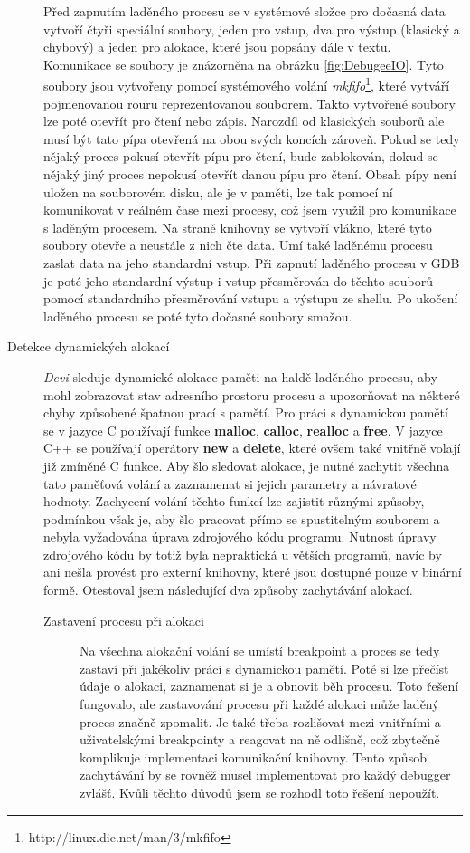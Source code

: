\documentclass[bc,male,python,dept460]{diploma}						%
\begin{document}
\begin{description}
			\par Před zapnutím laděného procesu se v systémové složce pro dočasná data vytvoří čtyři speciální soubory, jeden pro vstup, dva pro výstup
			(klasický a chybový) a jeden pro alokace, které jsou popsány dále v textu. Komunikace se soubory je znázorněna na obrázku \ref{fig:DebugeeIO}.
			Tyto soubory jsou vytvořeny pomocí systémového volání \textit{mkfifo}\footnote{http://linux.die.net/man/3/mkfifo}, které vytváří pojmenovanou rouru
			reprezentovanou souborem. Takto vytvořené soubory lze poté otevřít pro čtení nebo zápis. Narozdíl od klasických souborů ale musí být tato pípa otevřená na
			obou svých koncích zároveň. Pokud se tedy nějaký proces pokusí otevřít pípu pro čtení, bude zablokován, dokud se nějaký jiný proces nepokusí otevřít danou
			pípu pro čtení. Obsah pípy není uložen na souborovém disku, ale je v paměti, lze tak pomocí ní komunikovat v reálném čase mezi procesy, což jsem využil
			pro komunikace s laděným procesem. Na straně knihovny se vytvoří vlákno, které tyto soubory otevře a neustále z nich čte data. Umí také laděnému procesu
			zaslat data na jeho standardní vstup. Při zapnutí laděného procesu v GDB je poté jeho standardní výstup i vstup přesměrován do těchto souborů pomocí
			standardního přesměrování vstupu a výstupu ze shellu. %
			Po ukočení laděného procesu se poté tyto dočasné soubory smažou.
			
			\item[Detekce dynamických alokací]
			\textit{Devi} sleduje dynamické alokace paměti na haldě laděného procesu, aby mohl zobrazovat stav adresního prostoru procesu a upozorňovat na některé
			chyby způsobené špatnou prací s pamětí. Pro práci s dynamickou pamětí se v jazyce C používají funkce \textbf{malloc}, \textbf{calloc}, \textbf{realloc}
			a \textbf{free}. V jazyce C++ se používají operátory \textbf{new} a \textbf{delete}, které ovšem také vnitřně volají již zmíněné C funkce. Aby šlo sledovat
			alokace, je nutné zachytit všechna tato paměťová volání a zaznamenat si jejich parametry a návratové hodnoty. Zachycení volání těchto funkcí lze zajistit
			různými způsoby, podmínkou však je, aby šlo pracovat přímo se spustitelným souborem a nebyla vyžadována úprava zdrojového kódu programu.
			Nutnost úpravy zdrojového kódu by totiž byla nepraktická u větších programů, navíc by ani nešla provést pro externí knihovny, které jsou dostupné pouze v 
			binární formě.
			Otestoval jsem následující dva způsoby zachytávání alokací.
			\begin{description}
				\item[Zastavení procesu při alokaci] Na všechna alokační volání se umístí breakpoint a proces se tedy zastaví při jakékoliv práci s dynamickou
				pamětí. Poté si lze přečíst údaje o alokaci, zaznamenat si je a obnovit běh procesu. Toto řešení fungovalo, ale zastavování procesu při každé alokaci
				může laděný proces značně zpomalit. Je také třeba rozlišovat mezi vnitřními a uživatelskými breakpointy a reagovat na ně odlišně, což zbytečně
				komplikuje implementaci komunikační knihovny. Tento způsob zachytávání by se rovněž musel implementovat pro každý debugger zvlášť.
				Kvůli těchto důvodů jsem se rozhodl toto řešení nepoužít.
				

\end{description}
\end{description}
\end{document}
